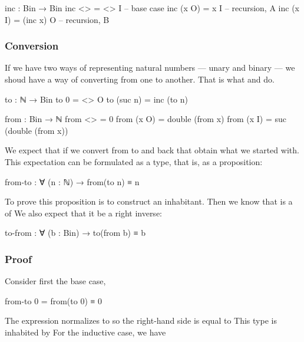 \begin{colored}[elm]
inc : Bin → Bin
inc <> = <> I          -- base case
inc (x O) = x I        -- recursion, A
inc (x I) = (inc x) O  -- recursion, B
\end{colored}


\subsubsection{Conversion}

If we have two ways of representing natural numbers — unary and binary — we shoud have a way of converting from one to another.  That is what  and 
 do.

\begin{colored}[elm]
to : ℕ → Bin
to 0 = <> O
to (suc n) = inc (to n)

from : Bin → ℕ
from <> = 0
from (x O) = double (from x)
from (x I) = suc (double  (from x))
\end{colored}

We expect that if we convert from  to  and back that obtain what we started with.  This expectation can be formulated as a type, that is, as a proposition:

\begin{colored}[elm]
from-to : ∀ (n : ℕ) → from(to n) ≡ n
\end{colored}

To prove this proposition is to construct an inhabitant.  Then we know that  is a  of  We also expect that it be a right inverse:

\begin{colored}[elm]
to-from : ∀ (b : Bin) → to(from b) ≡ b
\end{colored}


\subsubsection{Proof}

Consider first the base case, 

\begin{colored}[elm]
from-to 0 = from(to 0) ≡ 0
\end{colored}

The expression  normalizes to  so the right-hand side is equal to  This type is inhabited by  For the inductive case, we have 

